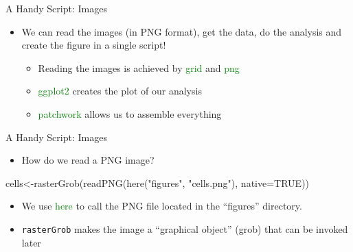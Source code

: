 \documentclass[
  ignorenonframetext,
]{beamer}
\newenvironment{Shaded}{\begin{snugshade}}{\end{snugshade}}
\newcommand{\AttributeTok}[1]{\textcolor[rgb]{0.40,0.45,0.13}{#1}}
\newcommand{\ConstantTok}[1]{\textcolor[rgb]{0.56,0.35,0.01}{#1}}
\newcommand{\FunctionTok}[1]{\textcolor[rgb]{0.28,0.35,0.67}{#1}}
\newcommand{\NormalTok}[1]{\textcolor[rgb]{0.00,0.23,0.31}{#1}}
\newcommand{\OtherTok}[1]{\textcolor[rgb]{0.00,0.23,0.31}{#1}}
\newcommand{\StringTok}[1]{\textcolor[rgb]{0.13,0.47,0.30}{#1}}
\providecommand{\tightlist}{%
  \setlength{\itemsep}{0pt}\setlength{\parskip}{0pt}}\usepackage{longtable,booktabs,array}
\begin{document}
\begin{frame}{A Handy Script: Images}
\protect\hypertarget{a-handy-script-images}{}
\begin{itemize}[<+->]
\tightlist
\item
  We can read the images (in PNG format), get the data, do the analysis
  and create the figure in a single script!

  \begin{itemize}[<+->]
  \tightlist
  \item
    Reading the images is achieved by \textcolor{green}{{grid}} and
    \textcolor{green}{{png}}
  \item
    \textcolor{green}{{ggplot2}} creates the plot of our analysis
  \item
    \textcolor{green}{{patchwork}} allows us to assemble everything
  \end{itemize}
\end{itemize}
\end{frame}

\begin{frame}[fragile]{A Handy Script: Images}
\protect\hypertarget{a-handy-script-images-1}{}
\begin{itemize}[<+->]
\tightlist
\item
  How do we read a PNG image?
\end{itemize}

\footnotesize

\begin{Shaded}
\begin{Highlighting}[]
\NormalTok{cells}\OtherTok{\textless{}{-}}\FunctionTok{rasterGrob}\NormalTok{(}\FunctionTok{readPNG}\NormalTok{(}\FunctionTok{here}\NormalTok{(}\StringTok{"figures"}\NormalTok{,}
                               \StringTok{"cells.png"}\NormalTok{),}
                          \AttributeTok{native=}\ConstantTok{TRUE}\NormalTok{))}
\end{Highlighting}
\end{Shaded}

\normalsize

\begin{itemize}[<+->]
\tightlist
\item
  We use \textcolor{green}{{here}} to call the PNG file located in the
  ``figures'' directory.
\item
  \texttt{rasterGrob} makes the image a ``graphical object'' (grob) that
  can be invoked later
\end{itemize}
\end{frame}
\end{document}
